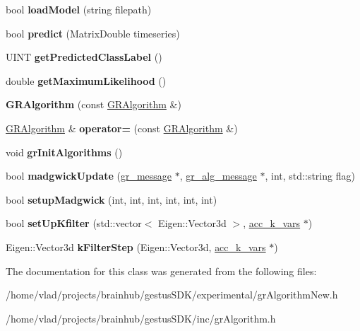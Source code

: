 \begin{DoxyCompactItemize}
\item 
\mbox{\label{classGRAlgorithm_a2088dfef7875042b8502b2eddd5c71b5}} 
bool {\bfseries load\+Model} (string filepath)
\item 
\mbox{\label{classGRAlgorithm_a4fef6d1d60eafba3a856c1ae3937a2a8}} 
bool {\bfseries predict} (Matrix\+Double timeseries)
\item 
\mbox{\label{classGRAlgorithm_aeadcc68fad1c5046e458026ae22ac123}} 
U\+I\+NT {\bfseries get\+Predicted\+Class\+Label} ()
\item 
\mbox{\label{classGRAlgorithm_aef4e7a848950b3b9e8ddf105bf49f836}} 
double {\bfseries get\+Maximum\+Likelihood} ()
\item 
\mbox{\label{classGRAlgorithm_ad507e4837f87aa62d71dcecdca81529e}} 
{\bfseries G\+R\+Algorithm} (const \mbox{\hyperlink{classGRAlgorithm}{G\+R\+Algorithm}} \&)
\item 
\mbox{\label{classGRAlgorithm_ac8f0e0ed3d860d09ca75159efa4b33fa}} 
\mbox{\hyperlink{classGRAlgorithm}{G\+R\+Algorithm}} \& {\bfseries operator=} (const \mbox{\hyperlink{classGRAlgorithm}{G\+R\+Algorithm}} \&)
\item 
\mbox{\label{classGRAlgorithm_aa088e3919a405f830dce381f7b264606}} 
void {\bfseries gr\+Init\+Algorithms} ()
\item 
\mbox{\label{classGRAlgorithm_a99d42de12749f53522f0bb3b470b876c}} 
bool {\bfseries madgwick\+Update} (\mbox{\hyperlink{structgr__message}{gr\+\_\+message}} $\ast$, \mbox{\hyperlink{structgr__alg__message}{gr\+\_\+alg\+\_\+message}} $\ast$, int, std\+::string flag)
\item 
\mbox{\label{classGRAlgorithm_a4dcbcdb9e123d4b406a44cbc0f7967c1}} 
bool {\bfseries setup\+Madgwick} (int, int, int, int, int, int)
\item 
\mbox{\label{classGRAlgorithm_af66f5bd468eef3647bd8df8942df2470}} 
bool {\bfseries set\+Up\+Kfilter} (std\+::vector$<$ Eigen\+::\+Vector3d $>$, \mbox{\hyperlink{structacc__k__vars}{acc\+\_\+k\+\_\+vars}} $\ast$)
\item 
\mbox{\label{classGRAlgorithm_a23e089dbd28adfe3e36dba5ecd02dd0a}} 
Eigen\+::\+Vector3d {\bfseries k\+Filter\+Step} (Eigen\+::\+Vector3d, \mbox{\hyperlink{structacc__k__vars}{acc\+\_\+k\+\_\+vars}} $\ast$)
\end{DoxyCompactItemize}


The documentation for this class was generated from the following files\+:\begin{DoxyCompactItemize}
\item 
/home/vlad/projects/brainhub/gestus\+S\+D\+K/experimental/gr\+Algorithm\+New.\+h\item 
/home/vlad/projects/brainhub/gestus\+S\+D\+K/inc/gr\+Algorithm.\+h\end{DoxyCompactItemize}
